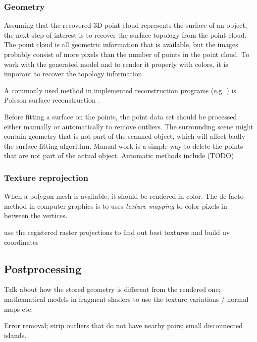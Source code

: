 
\subsubsection{Geometry} %

Assuming that the recovered 3D point cloud represents the surface of an object, the next step of interest is to recover the surface topology from the point cloud.
The point cloud is all geometric information that is available, but the images probably consist of more pixels than the number of points in the point cloud.
To work with the generated model and to render it properly with colors, it is imporant to recover the topology information.

A commonly used method in implemented reconstruction programs (e.g. \cite{meshlab}) is Poisson surface reconstruction \cite{kazhdan2013screened}.

Before fitting a surface on the points, the point data set should be processed either manually or automatically to remove outliers.
The surrounding scene might contain geometry that is not part of the scanned object, which will affect badly the surface fitting algorithm.
Manual work is a simple way to delete the points that are not part of the actual object. Automatic methods include (TODO)


\subsubsection{Texture reprojection} %

When a polygon mesh is available, it should be rendered in color. The de facto method in computer graphics is to uses \textit{texture mapping} to color pixels in between the vertices.

use the registered raster projections to find out best textures and build uv coordinates


\subsection{Postprocessing} %

Talk about how the stored geometry is different from the rendered one; mathematical models in fragment shaders to use the texture variations / normal maps etc.

Error removal; strip outliers that do not have nearby pairs; small disconnected islands.

